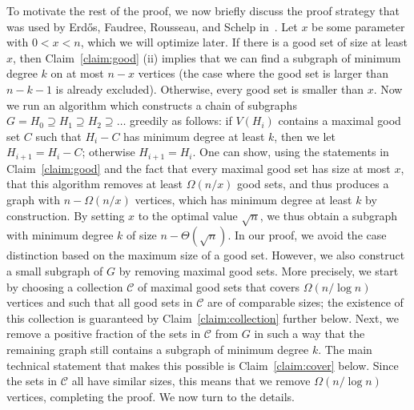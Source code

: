 \documentclass[11pt]{article}
\numberwithin{theorem}{section}
\begin{document}
To motivate the rest of the proof, we now briefly discuss the proof strategy
that was used by Erd\H{o}s, Faudree, Rousseau, and Schelp
in~\cite{ERDOS199053}. Let $x$ be some parameter with $0 < x < n$, which we
will optimize later. If there is a good set of size at least $x$, then
Claim~\ref{claim:good} (ii) implies that we can find a subgraph of minimum
degree $k$ on at most $n-x$ vertices (the case where the good set is larger
than $n-k-1$ is already excluded). Otherwise, every good set is smaller than
$x$. Now we run an algorithm which
constructs a chain of subgraphs $G = H_0\supseteq H_1\supseteq H_2 \supseteq
\dotsc$ greedily as follows: if $V(H_i)$ contains a maximal good set $C$ such
that $H_i-C$ has minimum degree at least $k$, then we let $H_{i+1}=H_i-C$;
otherwise $H_{i+1}=H_i$. One can show, using the statements in Claim~\ref{claim:good} and
the fact that every maximal good set has size at most $x$, that this
algorithm removes at least $\Omega(n/x)$ good sets, and thus produces a graph
with $n - \Omega(n/x)$ vertices, which has minimum degree at least $k$ by
construction. By setting $x$ to the optimal value $\sqrt{n}$, we thus obtain a
subgraph with minimum degree $k$ of size $n-\Theta(\sqrt{n})$. In our proof, we
avoid the case distinction based on the maximum size of a good set. However, we
also construct a small subgraph of $G$ by removing maximal good sets. More
precisely, we start by choosing a collection $\mathcal C$ of maximal good sets
that covers $\Omega(n/\log n)$ vertices and such that all good sets in
$\mathcal C$ are of comparable sizes; the existence of this collection is
guaranteed by Claim~\ref{claim:collection} further below. Next, we remove a
positive fraction of the sets in $\mathcal C$ from $G$ in such a way that the
remaining graph still contains a subgraph of minimum degree $k$. The main
technical statement that makes this possible is Claim~\ref{claim:cover} below.
Since the sets in $\mathcal C$ all have similar sizes, this means that we
remove $\Omega(n/\log n)$ vertices, completing the proof. We now turn to the
details.
\end{document}
